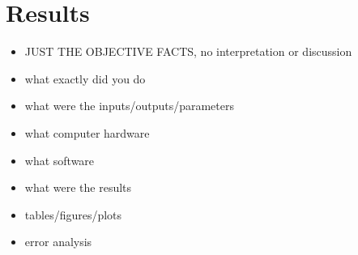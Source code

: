\section{Results} \label{sec:Results}
\begin{itemize}
  \item
    JUST THE OBJECTIVE FACTS, no interpretation or discussion
  \item
    what exactly did you do
  \item
    what were the inputs/outputs/parameters
  \item
    what computer hardware
  \item
    what software
  \item
    what were the results
  \item
    tables/figures/plots
  \item
    error analysis
\end{itemize}
